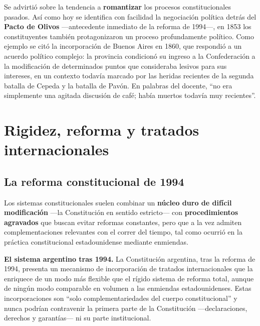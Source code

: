 \documentclass[12pt,oneside]{book}
\begin{document}
Se advirtió sobre la tendencia a \textbf{romantizar} los procesos constitucionales pasados. Así como hoy se identifica con facilidad la negociación política detrás del \textbf{Pacto de Olivos} ---antecedente inmediato de la reforma de 1994---, en 1853 los constituyentes también protagonizaron un proceso profundamente político. Como ejemplo se citó la incorporación de Buenos Aires en 1860, que respondió a un acuerdo político complejo: la provincia condicionó su ingreso a la Confederación a la modificación de determinados puntos que consideraba lesivos para sus intereses, en un contexto todavía marcado por las heridas recientes de la segunda batalla de Cepeda y la batalla de Pavón. En palabras del docente, ``no era simplemente una agitada discusión de café; había muertos todavía muy recientes''.

\chapter[Rigidez, reforma y tratados]{Rigidez, reforma y tratados internacionales}

\section{La reforma constitucional de 1994}

Los sistemas constitucionales suelen combinar un \textbf{núcleo duro de difícil modificación} ---la Constitución en sentido estricto--- con \textbf{procedimientos agravados} que buscan evitar reformas constantes, pero que a la vez admiten complementaciones relevantes con el correr del tiempo, tal como ocurrió en la práctica constitucional estadounidense mediante enmiendas.

\begin{important}
\textbf{El sistema argentino tras 1994.} La Constitución argentina, tras la reforma de 1994, presenta un mecanismo de incorporación de tratados internacionales que la enriquece de un modo más flexible que el rígido sistema de reforma total, aunque de ningún modo comparable en volumen a las enmiendas estadounidenses. Estas incorporaciones son ``solo complementariedades del cuerpo constitucional'' y nunca podrían contravenir la primera parte de la Constitución ---declaraciones, derechos y garantías--- ni su parte institucional.
\end{important}
\end{document}
